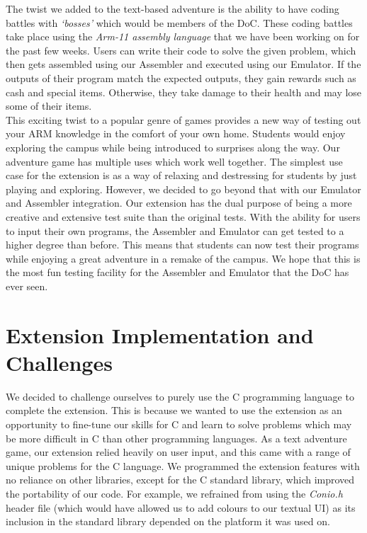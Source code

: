 \documentclass[10pt]{article}
\begin{document}
The twist we added to the text-based adventure is the ability to have coding battles with {\sl ‘bosses’} which would be members of the DoC. These coding battles take place using the {\sl Arm-11 assembly language} that we have been working on for the past few weeks. Users can write their code to solve the given problem, which then gets assembled using our Assembler and executed using our Emulator. If the outputs of their program match the expected outputs, they gain rewards such as cash and special items. Otherwise, they take damage to their health and may lose some of their items. 
\\

This exciting twist to a popular genre of games provides a new way of testing out your ARM knowledge in the comfort of your own home. Students would enjoy exploring the campus while being introduced to surprises along the way. Our adventure game has multiple uses which work well together. The simplest use case for the extension is as a way of relaxing and destressing for students by just playing and exploring. However, we decided to go beyond that with our Emulator and Assembler integration. Our extension has the dual purpose of being a more creative and extensive test suite than the original tests. With the ability for users to input their own programs, the Assembler and Emulator can get tested to a higher degree than before. This means that students can now test their programs while enjoying a great adventure in a remake of the campus. We hope that this is the most fun testing facility for the Assembler and Emulator that the DoC has ever seen. 

\section*{Extension Implementation and Challenges}

We decided to challenge ourselves to purely use the C programming language to complete the extension. This is because we wanted to use the extension as an opportunity to fine-tune our skills for C and learn to solve problems which may be more difficult in C than other programming languages. As a text adventure game, our extension relied heavily on user input, and this came with a range of unique problems for the C language. We programmed the extension features with no reliance on other libraries, except for the C standard library, which improved the portability of our code. For example, we refrained from using the {\sl Conio.h} header file (which would have allowed us to add colours to our textual UI) as its inclusion in the standard library depended on the platform it was used on. 
\\
\end{document}

